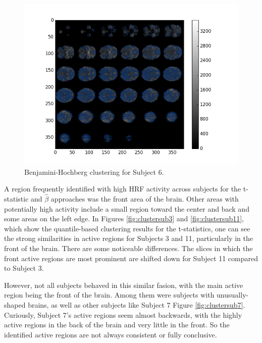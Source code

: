 \begin{figure}[ht]
\begin{minipage}[b]{0.45\linewidth}
	\centering
		\includegraphics[width=.8\linewidth]{../images/sub006_bh_overlay.png} 
	\caption{Benjamini-Hochberg clustering for Subject 6.}
	\label{fig:clusterBH}
\end{minipage}
\end{figure}

A region frequently identified with high HRF activity across subjects for the 
t-statistic and $\hat{\beta}$ approaches was the front area of the brain. 
Other areas with potentially high activity include a small region toward the 
center and back and some areas on the left edge. In Figures 
\ref{fig:clustersub3} and \ref{fig:clustersub11}, which show the 
quantile-based clustering results for the t-statistics, one can see the strong 
similarities in active regions for Subjects 3 and 11, particularly in the 
front of the brain. There are some noticeable differences. The slices in which 
the front active regions are most prominent are shifted down for Subject 11 
compared to Subject 3. 

However, not all subjects behaved in this similar fasion, with the main active 
region being the front of the brain. Among them were subjects with 
unusually-shaped brains, as well as other subjects like Subject 7 Figure 
\ref{fig:clustersub7}. Curiously, Subject 7's active regions seem almost 
backwards, with the highly active regions in the back of the brain and very 
little in the front. So the identified active regions are not always 
consistent or fully conclusive. 

